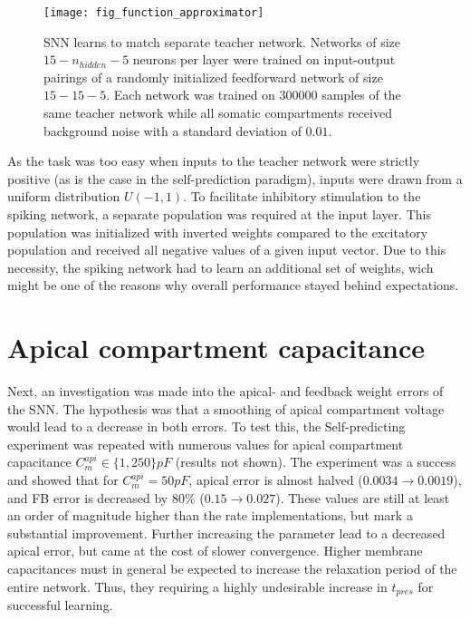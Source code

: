 \begin{figure}[h]
    \centering
    \texttt{[image: fig\_function\_approximator]}
    \caption[SNN learns to match separate teacher network]{SNN learns to match separate teacher network. Networks of
    size $15-n_{hidden}-5$ neurons per layer were trained on input-output pairings of a randomly initialized feedforward
    network of size $15-15-5$. Each network was trained on 300000 samples of the same teacher network while all somatic
    compartments received background noise with a standard deviation of $0.01$.}
    \label{fig-func-approx}
\end{figure}

As the task was too easy when inputs to the teacher network were strictly positive (as is the case in the
self-prediction paradigm), inputs were drawn from a uniform distribution $U(-1,1)$. To facilitate inhibitory stimulation
to the spiking network, a separate population was required at the input layer. This population was initialized with
inverted weights compared to the excitatory population and received all negative values of a given input vector. Due to
this necessity, the spiking network had to learn an additional set of weights, wich might be one of the reasons why
overall performance stayed behind expectations.


\section{Apical compartment capacitance}\label{sec-c-m-api}

Next, an investigation was made into the apical- and feedback weight errors of the SNN. The hypothesis was that a
smoothing of apical compartment voltage would lead to a decrease in both errors. To test this, the Self-predicting
experiment was repeated with numerous values for apical compartment capacitance $C_m^{api} \in \{ 1, 250 \} pF$ (results
not shown). The experiment was a success and showed that for $C_m^{api} = 50pF$, apical error is almost halved ($0.0034
    \rightarrow 0.0019$), and FB error is decreased by $80\%$ ($0.15 \rightarrow 0.027$). These values are still at least an
order of magnitude higher than the rate implementations, but mark a substantial improvement. Further increasing the
parameter lead to a decreased apical error, but came at the cost of slower convergence. Higher membrane capacitances
must in general be expected to increase the relaxation period of the entire network. Thus, they requiring a highly
undesirable increase in $t_{pres}$ for successful learning.

